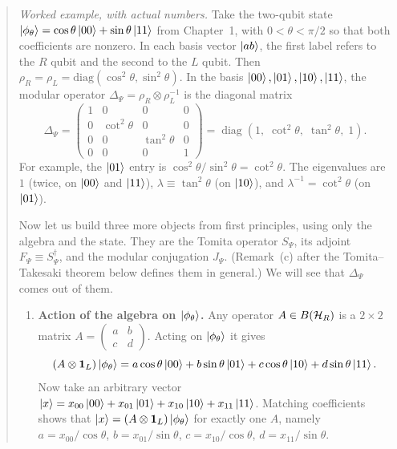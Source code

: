 \begin{quote}
\textit{Worked example, with actual numbers.} Take the two-qubit state
$\ket{\phi_\theta}=\cos\theta\ket{00}+\sin\theta\ket{11}$ from Chapter~1, with $0<\theta<\pi/2$ so that both
coefficients are nonzero. In each basis vector $\ket{ab}$, the first label refers to the $R$ qubit and the
second to the $L$ qubit. Then $\rho_R=\rho_L=\mathrm{diag}(\cos^2\theta,\sin^2\theta)$. In the basis
$\ket{00},\ket{01},\ket{10},\ket{11}$, the modular operator $\Delta_\Psi=\rho_R\otimes\rho_L^{-1}$ is the
diagonal matrix
\[
\Delta_\Psi = \begin{pmatrix} 1&0&0&0\\ 0&\cot^2\theta&0&0\\
0&0&\tan^2\theta&0\\0&0&0&1\end{pmatrix}
= \operatorname{diag}\left(1, \; \cot^2\theta, \; \tan^2\theta, \; 1\right) .
\]
For example, the $\ket{01}$ entry is $\cos^2\theta/\sin^2\theta=\cot^2\theta$. The eigenvalues are $1$
(twice, on $\ket{00}$ and $\ket{11}$), $\lambda\equiv\tan^2\theta$ (on $\ket{10}$), and
$\lambda^{-1}=\cot^2\theta$ (on $\ket{01}$).

Now let us build three more objects from first principles, using only the algebra and the state. They are the
Tomita operator $S_\Psi$, its adjoint $F_\Psi \equiv S_\Psi^\dagger$, and the modular conjugation $J_\Psi$.
(Remark~(c) after the Tomita--Takesaki theorem below defines them in general.) We will see that $\Delta_\Psi$
comes out of them.
\begin{enumerate}
\item \textbf{Action of the algebra on $\ket{\phi_\theta}$.} Any operator $A \in B(\mathcal{H}_R)$ is a $2\times2$
matrix $A = \begin{pmatrix} a & b \\ c & d \end{pmatrix}$. Acting on $\ket{\phi_\theta}$ it gives
\[
(A\otimes\mathbf{1}_L)\ket{\phi_\theta} = a\cos\theta\ket{00} + b\sin\theta\ket{01} + c\cos\theta\ket{10}
+ d\sin\theta\ket{11} .
\]
Now take an arbitrary vector $\ket x = x_{00}\ket{00} + x_{01}\ket{01} + x_{10}\ket{10} + x_{11}\ket{11}$.
Matching coefficients shows that $\ket x=(A\otimes\mathbf{1}_L)\ket{\phi_\theta}$ for exactly one $A$, namely
$a = x_{00}/\cos\theta$, $b = x_{01}/\sin\theta$, $c = x_{10}/\cos\theta$, $d = x_{11}/\sin\theta$.


\end{enumerate}
\end{quote}
